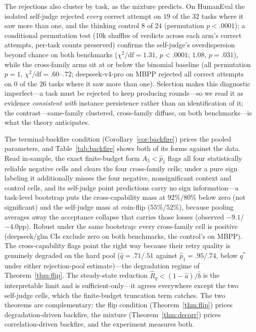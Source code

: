 \documentclass[10pt]{article}
\begin{document}
The rejections also cluster by task, as the mixture predicts.  On
HumanEval the isolated self-judge rejected \emph{every} correct
attempt on $19$ of the $32$ tasks where it saw more than one, and
the thinking control $8$ of $24$ (permutation $p < .0001$); a
conditional permutation test (10k shuffles of verdicts across
each arm's correct attempts, per-task counts preserved) confirms
the self-judge's overdispersion beyond chance on both benchmarks
($\chi^2/\mathrm{df} = 1.31$, $p < .0001$; $1.08$, $p = .031$),
while the cross-family arms sit at or below the binomial baseline
(all permutation $p = 1$, $\chi^2/\mathrm{df} = .60$--$.72$;
deepseek-v4-pro on MBPP rejected all correct attempts on $0$ of
the $26$ tasks where it saw more than one).  Selection makes
this diagnostic imperfect---a task must be rejected to keep
producing rounds---so we read it as evidence \emph{consistent
with} instance persistence rather than an identification of it;
the contrast---same-family clustered, cross-family diffuse, on
both benchmarks---is what the theory anticipates.

The terminal-backfire condition
(Corollary~\ref{cor:backfire}) prices the pooled parameters, and
Table~\ref{tab:backfire} shows both of its forms against the
data.  Read in-sample, the exact finite-budget form $A_5 <
\hat p_1$ flags all four statistically reliable negative cells
and clears the four cross-family cells; under a pure sign
labeling it additionally misses the four negative,
nonsignificant context and control cells, and its self-judge
point predictions carry no sign information---a task-level
bootstrap puts the cross-capability mass at $92\%/80\%$ below
zero (not significant) and the self-judge mass at coin-flip
($55\%/52\%$), because pooling averages away the acceptance
collapse that carries those losses (observed $-9.1$/$-4.0$pp).
Robust under the same bootstrap: every cross-family cell is
positive (deepseek/glm CIs exclude zero on both benchmarks, the
control's on MBPP).  The cross-capability flags point the right
way because their retry quality is genuinely degraded on the
hard pool ($\hat q = .71$/$.51$ against $\hat p_1 = .95$/$.74$,
below $q^\ast$ under either rejection-pool estimate)---the
degradation regime of Theorem~\ref{thm:flip}.  The steady-state
reduction
$\hat R_q < (1-\hat a)/\hat b$ is the interpretable limit and is
sufficient-only---it agrees everywhere except the two self-judge
cells, which the finite-budget truncation term catches.  The two
theorems are complementary: the flip condition
(Theorem~\ref{thm:flip}) prices degradation-driven backfire, the
mixture (Theorem~\ref{thm:decorr}) prices correlation-driven
backfire, and the experiment measures both.
\end{document}
